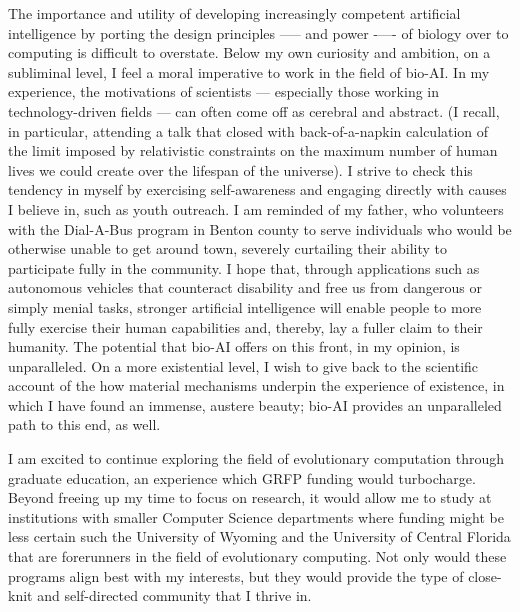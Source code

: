\documentclass[12pt]{book}
\begin{document}
The importance and utility of developing increasingly competent artificial intelligence by porting the design principles —-- and power -—- of biology over to computing is difficult to overstate. Below my own curiosity and ambition, on a subliminal level, I feel a moral imperative to work in the field of bio-AI. In my experience, the motivations of scientists --- especially those working in technology-driven fields --- can often come off as cerebral and abstract. (I recall, in particular, attending a talk that closed with back-of-a-napkin calculation of the limit imposed by relativistic constraints on the maximum number of human lives we could create over the lifespan of the universe). I strive to check this tendency in myself by exercising self-awareness and engaging directly with causes I believe in, such as youth outreach. I am reminded of my father, who volunteers with the Dial-A-Bus program in Benton county to serve individuals who would be otherwise unable to get around town, severely curtailing their ability to participate fully in the community. I hope that, through applications such as autonomous vehicles that counteract disability and free us from dangerous or simply menial tasks, stronger artificial intelligence will enable people to more fully exercise their human capabilities and, thereby, lay a fuller claim to their humanity. The potential that bio-AI offers on this front, in my opinion, is unparalleled. On a more existential level, I wish to give back to the scientific account of the how material mechanisms underpin the experience of existence, in which I have found an immense, austere beauty; bio-AI provides an unparalleled path to this end, as well.


I am excited to continue exploring the field of evolutionary computation through graduate education, an experience which GRFP funding would turbocharge. Beyond freeing up my time to focus on research, it would allow me to study at institutions with smaller Computer Science departments where funding might be less certain such the University of Wyoming and the University of Central Florida that are forerunners in the field of evolutionary computing. Not only would these programs align best with my interests, but they would provide the type of close-knit and self-directed community that I thrive in. 
\end{document}
